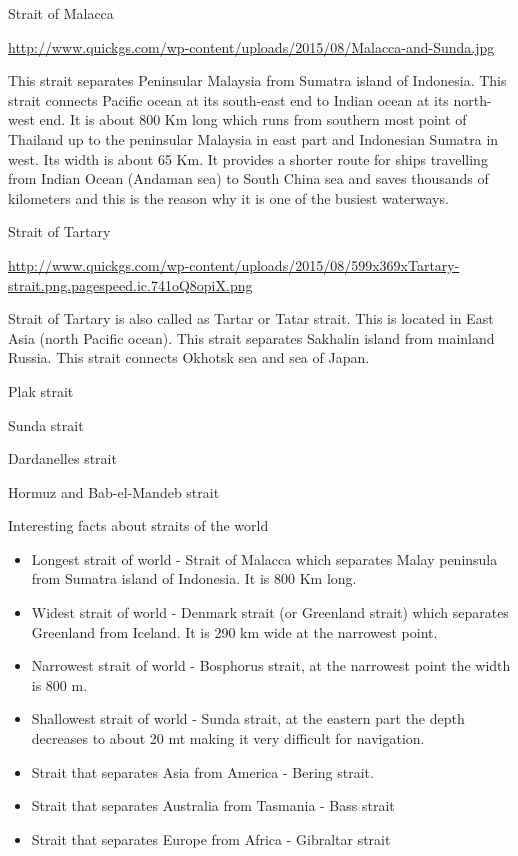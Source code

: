 \documentclass[
  openany]{book}
\providecommand{\tightlist}{%
  \setlength{\itemsep}{0pt}\setlength{\parskip}{0pt}}
\begin{document}
Strait of Malacca

\url{http://www.quickgs.com/wp-content/uploads/2015/08/Malacca-and-Sunda.jpg}

This strait separates Peninsular Malaysia from Sumatra island of Indonesia. This strait connects Pacific ocean at its south-east end to Indian ocean at its north-west end. It is about 800 Km long which runs from southern most point of Thailand up to the peninsular Malaysia in east part and Indonesian Sumatra in west. Its width is about 65 Km. It provides a shorter route for ships travelling from Indian Ocean (Andaman sea) to South China sea and saves thousands of kilometers and this is the reason why it is one of the busiest waterways.

Strait of Tartary

\url{http://www.quickgs.com/wp-content/uploads/2015/08/599x369xTartary-strait.png.pagespeed.ic.741oQ8opiX.png}

Strait of Tartary is also called as Tartar or Tatar strait. This is located in East Asia (north Pacific ocean). This strait separates Sakhalin island from mainland Russia. This strait connects Okhotsk sea and sea of Japan.

Plak strait

Sunda strait

Dardanelles strait

Hormuz and Bab-el-Mandeb strait

Interesting facts about straits of the world

\begin{itemize}
\tightlist
\item
  Longest strait of world - Strait of Malacca which separates Malay peninsula from Sumatra island of Indonesia. It is 800 Km long.
\item
  Widest strait of world - Denmark strait (or Greenland strait) which separates Greenland from Iceland. It is 290 km wide at the narrowest point.
\item
  Narrowest strait of world - Bosphorus strait, at the narrowest point the width is 800 m.
\item
  Shallowest strait of world - Sunda strait, at the eastern part the depth decreases to about 20 mt making it very difficult for navigation.
\item
  Strait that separates Asia from America - Bering strait.
\item
  Strait that separates Australia from Tasmania - Bass strait
\item
  Strait that separates Europe from Africa - Gibraltar strait
\end{itemize}
\end{document}
